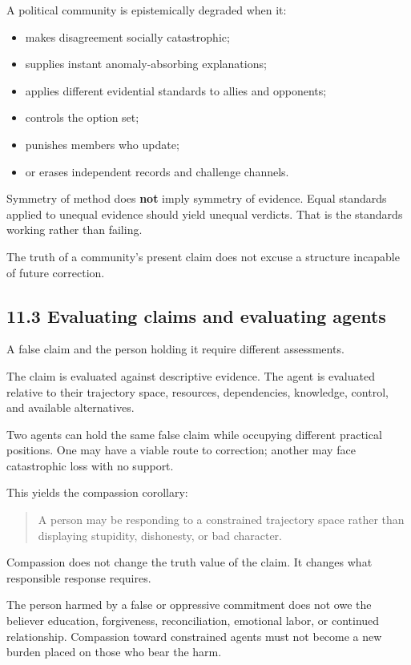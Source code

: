 \documentclass[
  11pt,
]{article}
\providecommand{\tightlist}{%
  \setlength{\itemsep}{0pt}\setlength{\parskip}{0pt}}
\begin{document}
A political community is epistemically degraded when it:

\begin{itemize}
\tightlist
\item
  makes disagreement socially catastrophic;
\item
  supplies instant anomaly-absorbing explanations;
\item
  applies different evidential standards to allies and opponents;
\item
  controls the option set;
\item
  punishes members who update;
\item
  or erases independent records and challenge channels.
\end{itemize}

Symmetry of method does \textbf{not} imply symmetry of evidence. Equal
standards applied to unequal evidence should yield unequal verdicts.
That is the standards working rather than failing.

The truth of a community's present claim does not excuse a structure
incapable of future correction.

\subsection{11.3 Evaluating claims and evaluating
agents}\label{evaluating-claims-and-evaluating-agents}

A false claim and the person holding it require different assessments.

The claim is evaluated against descriptive evidence. The agent is
evaluated relative to their trajectory space, resources, dependencies,
knowledge, control, and available alternatives.

Two agents can hold the same false claim while occupying different
practical positions. One may have a viable route to correction; another
may face catastrophic loss with no support.

This yields the compassion corollary:

\begin{quote}
A person may be responding to a constrained trajectory space rather than
displaying stupidity, dishonesty, or bad character.
\end{quote}

Compassion does not change the truth value of the claim. It changes what
responsible response requires.

The person harmed by a false or oppressive commitment does not owe the
believer education, forgiveness, reconciliation, emotional labor, or
continued relationship. Compassion toward constrained agents must not
become a new burden placed on those who bear the harm.
\end{document}
